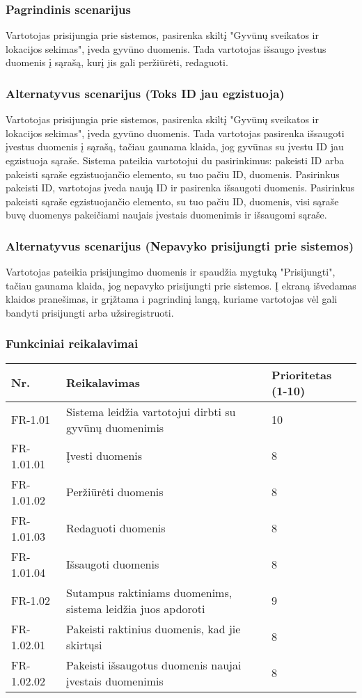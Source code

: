 \documentclass[oneside]{VUMIFPSkursinis}
\begin{document}
\subsubsection{Pagrindinis scenarijus}
	Vartotojas prisijungia prie sistemos, pasirenka skiltį "Gyvūnų sveikatos ir lokacijos sekimas", įveda gyvūno duomenis. Tada vartotojas išsaugo įvestus duomenis į sąrašą, kurį jis gali peržiūrėti, redaguoti.
\subsubsection{Alternatyvus scenarijus (Toks ID jau egzistuoja)}
	Vartotojas prisijungia prie sistemos, pasirenka skiltį "Gyvūnų sveikatos ir lokacijos sekimas", įveda gyvūno duomenis. Tada vartotojas pasirenka išsaugoti įvestus duomenis į sąrašą, tačiau gaunama klaida, jog gyvūnas su įvestu ID jau egzistuoja sąraše. Sistema pateikia vartotojui du pasirinkimus: pakeisti ID arba pakeisti sąraše egzistuojančio elemento, su tuo pačiu ID, duomenis.
	Pasirinkus pakeisti ID, vartotojas įveda naują ID ir pasirenka išsaugoti duomenis. 
	Pasirinkus pakeisti sąraše egzistuojančio elemento, su tuo pačiu ID, duomenis, visi sąraše buvę duomenys pakeičiami naujais įvestais duomenimis ir išsaugomi sąraše.
\subsubsection{Alternatyvus scenarijus (Nepavyko prisijungti prie sistemos)}
	Vartotojas pateikia prisijungimo duomenis ir spaudžia mygtuką "Prisijungti", tačiau gaunama klaida, jog nepavyko prisijungti prie sistemos. Į ekraną išvedamas klaidos pranešimas, ir grįžtama i pagrindinį langą, kuriame vartotojas vėl gali bandyti prisijungti arba užsiregistruoti.
\subsubsection{Funkciniai reikalavimai}
\begin{table}[htbp]
	\begin{tabularx}{1\textwidth}{ |P{2.5cm}|X|P{3cm }| } \hline
           	Nr. & Reikalavimas &  Prioritetas (1-10)  \\   \hline 
         	FR-1.01 & Sistema leidžia vartotojui dirbti su gyvūnų duomenimis & 10  \\   \hline
		FR-1.01.01 & Įvesti duomenis & 8 \\ \hline
		FR-1.01.02 & Peržiūrėti duomenis & 8 \\ \hline
		FR-1.01.03 & Redaguoti duomenis & 8 \\ \hline
		FR-1.01.04 & Išsaugoti duomenis & 8 \\ \hline
        	FR-1.02 & Sutampus raktiniams duomenims, sistema leidžia juos apdoroti & 9   \\   \hline
		FR-1.02.01 & Pakeisti raktinius duomenis, kad jie skirtųsi & 8 \\ \hline
		FR-1.02.02 & Pakeisti išsaugotus duomenis naujai įvestais duomenimis & 8 \\ \hline
	\end{tabularx}
\end{table}
\end{document}
